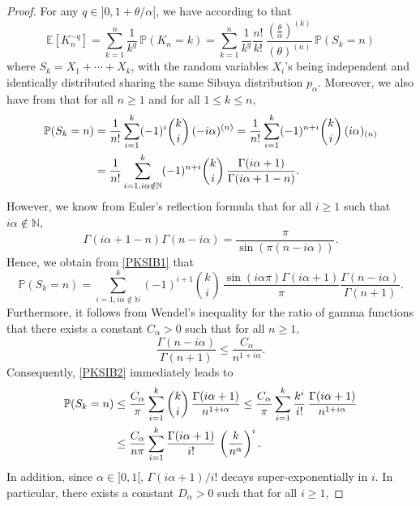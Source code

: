 \documentclass[twoside,12pt]{article}
\newcommand{\dN}{\mathbb{N}}
\newcommand{\dP}{\mathbb{P}}
\newcommand{\E}{\mathds{E}}
\begin{document}
\begin{proof}
For any $q\in]0,1\!+\!\theta/\alpha[$, we have according to \citet[Formula (3.45)]{Pit(06)} that
\begin{equation}
\label{PKSIB}
\E[K_n^{-q}]
= \sum_{k=1}^n \frac{1}{k^{q}}\, \dP(K_n=k)=\sum_{k=1}^n \frac{1}{k^{q}}
\frac{n!}{k!}\,\frac{\left(\frac{\theta}{\alpha}\right)^{(k)}}{(\theta)^{(n)}}\,
\dP(S_k=n)
\end{equation}
where $S_k=X_1+\cdots+X_k$, with the random variables $X_{i}$'s being independent and identically distributed sharing the same Sibuya distribution $p_{\alpha}$. Moreover, we also have from \citet[Formula (3.44)]{Pit(06)} that for all $n \geq 1$ and for all $1\leq k \leq n$,
\begin{align} 
\dP(S_k=n)&=\frac{1}{n!}\sum_{i=1}^k (-1)^{i}\binom{k}{i}\,(-i \alpha)^{(n)}=\frac{1}{n!}\sum_{i=1}^k (-1)^{n+i}\binom{k}{i}\,(i\alpha )_{(n)}  \notag \\
 &=\frac{1}{n!} \sum_{i=1, i \alpha \notin\dN}^k (-1)^{n+i}\binom{k}{i}\,\frac{\Gamma(i\alpha +1)}{\Gamma(i\alpha+1-n) }. 
\label{PKSIB1}
\end{align}
However, we know from Euler's reflection formula that for all $i \geq 1$ such that 
$i \alpha \notin\dN$, 
\begin{equation*}
\Gamma(i\alpha+1-n)\Gamma(n-i\alpha)=\frac{\pi}{\sin(\pi(n-i\alpha))}.
\end{equation*}
Hence, we obtain from \eqref{PKSIB1} that
\begin{equation} 
\dP(S_k=n)= \sum_{i=1, i \alpha \notin\dN}^k (-1)^{i+1}\binom{k}{i}\,\frac{\sin(i \alpha \pi)\Gamma(i\alpha +1)}{\pi} \frac{\Gamma(n-i\alpha)}{\Gamma(n+1)}. 
\label{PKSIB2}
\end{equation}
Furthermore, it follows from Wendel’s inequality for the ratio of gamma functions that there exists a constant $C_\alpha >0$ such that
for all $n \geq 1$,  
$$
\frac{\Gamma(n-i\alpha)}{\Gamma(n+1)} \leq  \frac{C_\alpha}{n^{1+i \alpha}}.
$$
Consequently, \eqref{PKSIB2} immediately leads to 
\begin{align} 
\dP(S_k=n)&\leq \frac{C_\alpha}{\pi}\sum_{i=1}^k \binom{k}{i}\,\frac{\Gamma(i\alpha +1)}{n^{1+i \alpha} } \leq \frac{C_\alpha}{\pi}\sum_{i=1}^k \frac{k^i}{i!}\,\frac{\Gamma(i\alpha +1)}{n^{1+i \alpha} } \notag \\
&\leq \frac{C_\alpha}{n \pi}\sum_{i=1}^k \frac{\Gamma(i\alpha +1)}{i!}\,\left(\frac{k}{n^{\alpha} }\right)^i.
\label{PKSIB3}
\end{align}
In addition, since $\alpha\in]0,1[$, $\Gamma(i\alpha+1)/i!$ decays super-exponentially in $i$. In particular, there exists a constant $D_\alpha>0$ such that for all $i \geq 1$,

\end{proof}
\end{document}
